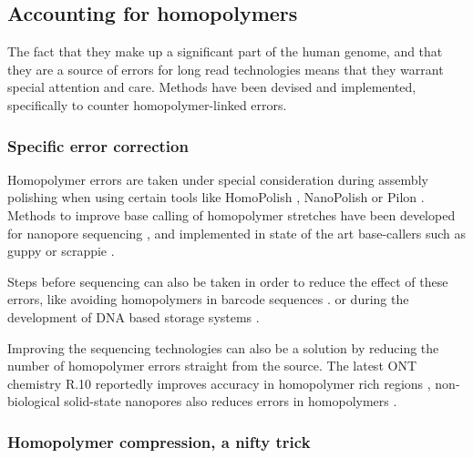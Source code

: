 \documentclass[
  11pt,
  twoside,
  BCOR=10mm,
  listof=totoc]{scrbook}
\begin{document}
\hypertarget{accounting-for-homopolymers}{%
\subsection{Accounting for homopolymers}\label{accounting-for-homopolymers}}

The fact that they make up a significant part of the human genome, and that they are a source of errors for long read technologies means that they warrant special attention and care. Methods have been devised and implemented, specifically to counter homopolymer-linked errors.

\hypertarget{specific-error-correction}{%
\subsubsection{Specific error correction}\label{specific-error-correction}}

Homopolymer errors are taken under special consideration during assembly polishing when using certain tools like HomoPolish \autocite{huangHomopolishMethodRemoval2021}, NanoPolish \autocite{simpsonDetectingDNACytosine2017} or Pilon \autocite{walkerPilonIntegratedTool2014}. Methods to improve base calling of homopolymer stretches have been developed for nanopore sequencing \autocite{rangSquiggleBasepairComputational2018,sarkozyCallingHomopolymerStretches2018}, and implemented in state of the art base-callers such as guppy or scrappie \autocite{wickPerformanceNeuralNetwork2019}.

Steps before sequencing can also be taken in order to reduce the effect of these errors, like avoiding homopolymers in barcode sequences \autocite{hawkinsIndelcorrectingDNABarcodes2018,srivathsanMinIONBasedPipeline2018}. or during the development of DNA based storage systems \autocite{wangConstructionBioConstrainedCode2019}.

Improving the sequencing technologies can also be a solution by reducing the number of homopolymer errors straight from the source. The latest ONT chemistry R.10 reportedly improves accuracy in homopolymer rich regions \autocite{R10NewestNanopore,amarasingheOpportunitiesChallengesLongread2020}, non-biological solid-state nanopores also reduces errors in homopolymers \autocite{zhouDetectionDNAHomopolymer2019,gotoIdentificationFourSinglestranded2018}.

\hypertarget{hpc-trick}{%
\subsubsection{Homopolymer compression, a nifty trick}\label{hpc-trick}}
\end{document}
